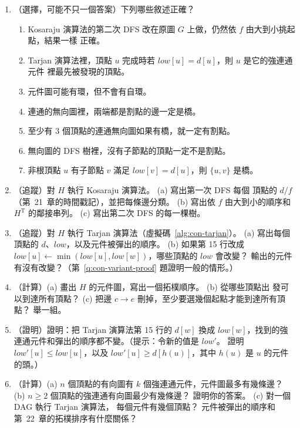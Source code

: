 \begin{enumerate}
\item \label{q:con-choice}（選擇，可能不只一個答案）下列哪些敘述正確？
\begin{enumerate}
\item Kosaraju 演算法的第二次 DFS 改在原圖 $G$ 上做，仍然依 $f$ 由大到小挑起點，結果一樣
正確。
\item Tarjan 演算法裡，頂點 $u$ 完成時若 $\mathit{low}[u] = d[u]$，則 $u$ 是它的強連通元件
裡最先被發現的頂點。
\item 元件圖可能有環，但不會有自環。
\item 連通的無向圖裡，兩端都是割點的邊一定是橋。
\item 至少有 $3$ 個頂點的連通無向圖如果有橋，就一定有割點。
\item 無向圖的 DFS 樹裡，沒有子節點的頂點一定不是割點。
\item 非根頂點 $u$ 有子節點 $v$ 滿足 $\mathit{low}[v] = d[u]$，則 $\{u, v\}$ 是橋。
\end{enumerate}

\item \label{q:con-kosaraju}（追蹤）對 $H$ 執行 Kosaraju 演算法。 (a) 寫出第一次 DFS 每個
頂點的 $d/f$（第~21~章的時間戳記），並把每條邊分類。 (b) 寫出依 $f$ 由大到小的順序和
$H^{\mathrm{T}}$ 的鄰接串列。 (c) 寫出第二次 DFS 的每一棵樹。

\item \label{q:con-tarjan-h}（追蹤）對 $H$ 執行 Tarjan 演算法（虛擬碼~\ref{alg:con-tarjan}）。
(a) 寫出每個頂點的 $d$、$\mathit{low}$，以及元件被彈出的順序。 (b) 如果第 15 行改成
$\mathit{low}[u] \gets \min(\mathit{low}[u], \mathit{low}[w])$，哪些頂點的 $\mathit{low}$
會改變？ 輸出的元件有沒有改變？（第~\ref{q:con-variant-proof} 題證明一般的情形。）

\item \label{q:con-dag-h}（計算）(a) 畫出 $H$ 的元件圖，寫出一個拓樸順序。 (b) 從哪些頂點出
發可以到達所有頂點？ (c) 把邊 $c \to e$ 刪掉，至少要選幾個起點才能到達所有頂點？ 舉一組。

\item \label{q:con-variant-proof}（證明）證明：把 Tarjan 演算法第 15 行的 $d[w]$ 換成
$\mathit{low}[w]$，找到的強連通元件和彈出的順序都不變。（提示：令新的值是
$\mathit{low}'$。 證明 $\mathit{low}'[u] \le \mathit{low}[u]$，以及 $\mathit{low}'[u] \ge
d[h(u)]$，其中 $h(u)$ 是 $u$ 的元件的頭。）

\item （計算）(a) $n$ 個頂點的有向圖有 $k$ 個強連通元件，元件圖最多有幾條邊？ (b) $n \ge 2$
個頂點的強連通有向圖最少有幾條邊？ 證明你的答案。 (c) 對一個 DAG 執行 Tarjan 演算法，
每個元件有幾個頂點？ 元件被彈出的順序和第~22~章的拓樸排序有什麼關係？


\end{enumerate}
